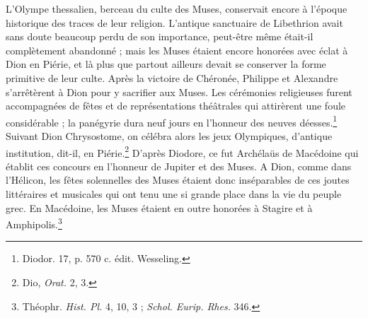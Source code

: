 \documentclass[a4paper, 11pt, oneside, polutonikogreek, french]{article}
\begin{document}
L'Olympe thessalien, berceau du culte des Muses, conservait encore à l'époque historique des traces de leur religion. L'antique sanctuaire de Libethrion avait sans doute beaucoup perdu de son importance, peut-être même était-il complètement abandonné ; mais les Muses étaient encore honorées avec éclat à Dion en Piérie, et là plus que partout ailleurs devait se conserver la forme primitive de leur culte. Après la victoire de Chéronée, Philippe et Alexandre s'arrêtèrent à Dion pour y sacrifier aux Muses. Les cérémonies religieuses furent accompagnées de fêtes et de représentations théâtrales qui attirèrent une foule considérable ; la panégyrie dura neuf jours en l'honneur des neuves déesses.\footnote{Diodor. 17, p. 570 c. édit. Wesseling.} Suivant Dion Chrysostome, on célébra alors les jeux Olympiques, d'antique institution, dit-il, en Piérie.\footnote{Dio, \emph{Orat.} 2, 3.} D'après Diodore, ce fut Archélaüs de Macédoine qui établit ces concours en l'honneur de Jupiter et des Muses. A Dion, comme dans l'Hélicon, les fêtes solennelles des Muses étaient donc inséparables de ces joutes littéraires et musicales qui ont tenu une si grande place dans la vie du peuple grec. En Macédoine, les Muses étaient en outre honorées à Stagire et à Amphipolis.\footnote{Théophr. \emph{Hist. Pl.} 4, 10, 3 ; \emph{Schol. Eurip. Rhes.} 346.}
\end{document}
